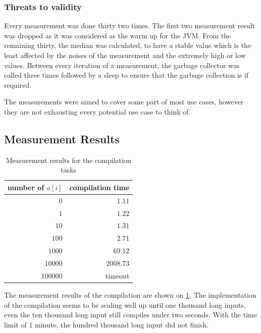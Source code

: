     
        \subsubsection{Threats to validity}
        Every measurement was done thirty two times. The first two measurement result was dropped as it was considered as the warm up for the JVM. From the remaining thirty, the median was calculated, to have a stable value which is the least affected by the noises of the measurement and the extremely high or low values. Between every iteration of a measurement, the garbage collector was called three times followed by a sleep to ensure that the garbage collection is if required.
        
        The measurements were aimed to cover some part of most use cases, however they are not exhausting every potential use case to think of.
        
        
    
    \subsection{Measurement Results}
        \begin{table}
            \centering
            \caption{Measurement results for the compilation tasks}     
            \label{tab:cep:meascompile}
            \begin{tabular}{rr}
                \toprule
                number of $a[i]$ & compilation time \\ \midrule
                             $0$ &                  $1.11$ \\
                             $1$ &                  $1.22$ \\
                            $10$ &                  $1.31$ \\
                           $100$ &                  $2.71$ \\
                          $1000$ &                 $69.12$ \\
                         $10000$ &               $2008.73$ \\
                        $100000$ &                 timeout \\ \bottomrule
            \end{tabular}
        \end{table}
        The measurement results of the compilation are shown on \cref{tab:cep:meascompile}.
        The implementation of the compilation seems to be scaling well up until one thousand long inputs, even the ten thousand long input still compiles under two seconds. With the time limit of 1 minute, the hundred thousand long input did not finish.
        

